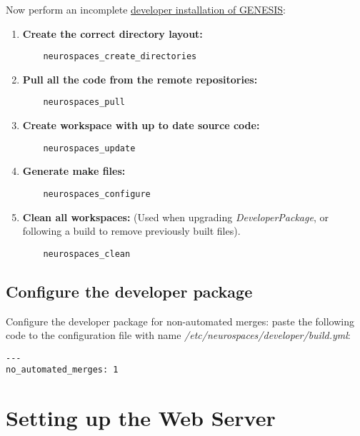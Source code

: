 \documentclass[12pt]{article}
\begin{document}
Now perform an incomplete
\href{../installation-developer/installation-developer.tex}{developer
  installation of GENESIS}:

\begin{enumerate}
\item {\bf Create the correct directory layout:}
\begin{verbatim}
	neurospaces_create_directories
\end{verbatim}
  
\item {\bf Pull all the code from the remote repositories:}
\begin{verbatim}
	neurospaces_pull
\end{verbatim}

\item {\bf Create workspace with up to date source code:}
\begin{verbatim}
	neurospaces_update
\end{verbatim}

\item {\bf Generate make files:}
\begin{verbatim}
	neurospaces_configure
\end{verbatim}

\item {\bf Clean all workspaces:} (Used when upgrading {\it DeveloperPackage}, or following a build to remove previously built files).
\begin{verbatim}
	neurospaces_clean
\end{verbatim}

\end{enumerate}


\subsection*{Configure the developer package}

Configure the developer package for non-automated merges: paste the
following code to the configuration file with name {\it
  /etc/neurospaces/developer/build.yml}:

\begin{verbatim}
---
no_automated_merges: 1
\end{verbatim}

\section*{Setting up the Web Server}
\end{document}
